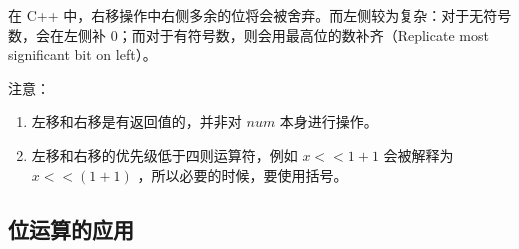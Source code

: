 在 C++ 中，右移操作中右侧多余的位将会被舍弃。而左侧较为复杂：对于无符号数，会在左侧补 0；而对于有符号数，则会用最高位的数补齐（Replicate most significant bit on left）。

注意：

\begin{enumerate}
\item 左移和右移是有返回值的，并非对 $num$ 本身进行操作。
\item 左移和右移的优先级低于四则运算符，例如 $x<<1+1$ 会被解释为 $x<<(1+1)$ ，所以必要的时候，要使用括号。
\end{enumerate}

\hr

\subsection{位运算的应用}

